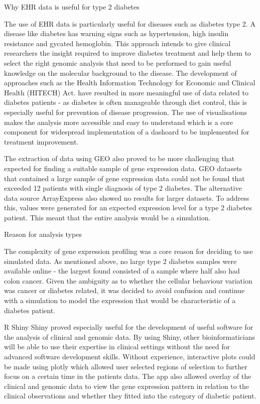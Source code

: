 \documentclass{bioinfo}
\begin{document}
\begin{Discussion}
Why EHR data is useful for type 2 diabetes 

The use of EHR data is particularly useful for diseases such as diabetes type 2. A disease like diabetes has warning signs such as hypertension, high insulin resistance and gycated hemoglobin. This approach intends to give clinical researchers the insight required to improve diabetes treatment and help them to select the right genomic analysis that need to be performed to gain useful knowledge on the molecular background to the disease. The development of approaches such as the Health Information Technology for Economic and Clinical Health (HITECH) Act. have resulted in more meaningful use of data related to diabetes patients - as diabetes is often manageable through diet control, this is especially useful for prevention of disease progression. The use of visualisations makes the analysis more accessible and easy to understand which is a core component for widespread implementation of a dashoard to be implemented for treatment improvement. 

The extraction of data using GEO also proved to be more challenging that expected for finding a suitable sample of gene expression data. GEO datasets that contained a large sample of gene expression data could not be found that exceeded 12 patients with single diagnosis of type 2 diabetes. The alternative data source ArrayExpress also showed no results for larger datasets.
To address this, values were generated for an expected expression level for a type 2 diabetes patient. This meant that the entire analysis would be a simulation. 

Reason for analysis types

The complexity of gene expression profiling was a core reason for deciding to use simulated data. As mentioned above, no large type 2 diabetes samples were available online - the largest found consisted of a sample where half also had colon cancer. Given the ambiguity as to whether the cellular behaviour variation was cancer or diabetes related, it was decided to avoid confusion and continue with a simulation to model the expression that would be characteristic of a diabetes patient.  

R Shiny
Shiny proved especially useful for the development of useful software for the analysis of clinical and genomic data. By using Shiny, other bioinformaticians will be able to use their expertise in clinical settings without the need for advanced software development skills. Without experience, interactive plots could be made using plotly which allowed user selected regions of selection to further focus on a certain time in the patients data. The app also allowed overlay of the clinical and genomic data to view the gene expression pattern in relation to the clinical observations and whether they fitted into the category of diabetic patient. 


\end{Discussion}
\end{document}
